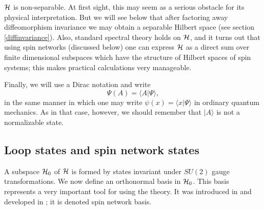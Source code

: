 \documentclass[12pt]{article}
\begin{document}
$\cal H$ is non-separable.  At first sight, this may seem as a 
serious obstacle for its physical interpretation.  But we will 
see below that after factoring away diffeomorphism invariance we 
may obtain a separable Hilbert space (see section 
\ref{diffinvariance}).  Also, standard spectral theory holds on 
$\cal H$, and it turns out that using spin networks (discussed 
below) one can express $\cal H$ as a direct sum over finite 
dimensional subspaces which have the structure of Hilbert spaces 
of spin systems; this makes practical calculations very 
manageable.

Finally, we will use a Dirac notation and write 
\begin{equation}
	\Psi(A) = \langle A | \Psi \rangle,
	\label{dirac}
\end{equation}
in the same manner in which one may write $\psi(x) = \langle x | 
\Psi \rangle$ in ordinary quantum mechanics. As in that case, 
however, we should remember that $|A\rangle$ is not a 
normalizable state. 

\subsection{Loop states and spin network states}
\label{states}

A subspace ${\cal H}_{0}$ of $\cal H$ is formed by states 
invariant under $SU(2)$ gauge transformations.  We now define an 
orthonormal basis in ${\cal H}_{0}$.  This basis represents a 
very important tool for using the theory.  It was introduced in 
\cite{RovelliSmolin95b} and developed in \cite{Baez95a,Baez95aa}; 
it is denoted spin network basis.
\end{document}
